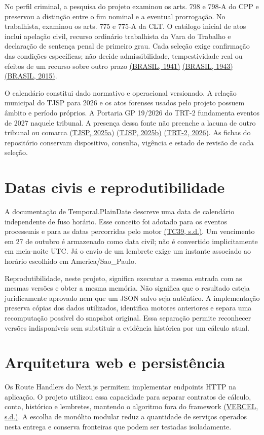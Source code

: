 No perfil criminal, a pesquisa do projeto examinou os arts. 798 e 798-A do CPP e preservou a distinção entre o fim nominal e a eventual prorrogação. No trabalhista, examinou os arts. 775 e 775-A da CLT. O catálogo inicial de atos inclui apelação civil, recurso ordinário trabalhista da Vara do Trabalho e declaração de sentença penal de primeiro grau. Cada seleção exige confirmação das condições específicas; não decide admissibilidade, tempestividade real ou efeitos de um recurso sobre outro prazo \hyperref[ref:CPP]{(BRASIL, 1941)} \hyperref[ref:CLT]{(BRASIL, 1943)} \hyperref[ref:CPC]{(BRASIL, 2015)}.

O calendário constitui dado normativo e operacional versionado. A relação municipal do TJSP para 2026 e os atos forenses usados pelo projeto possuem âmbito e período próprios. A Portaria GP 19/2026 do TRT-2 fundamenta eventos de 2027 naquele tribunal. A presença dessa fonte não preenche a lacuna de outro tribunal ou comarca \hyperref[ref:TJSPMUN]{(TJSP, 2025a)} \hyperref[ref:TJSP2813]{(TJSP, 2025b)} \hyperref[ref:TRT2027]{(TRT-2, 2026)}. As fichas do repositório conservam dispositivo, consulta, vigência e estado de revisão de cada seleção.

\section{Datas civis e reprodutibilidade}
\label{section-2-3}
A documentação de Temporal.PlainDate descreve uma data de calendário independente de fuso horário. Esse conceito foi adotado para os eventos processuais e para as datas percorridas pelo motor \hyperref[ref:TEMPORAL]{(TC39, s.d.)}. Um vencimento em 27 de outubro é armazenado como data civil; não é convertido implicitamente em meia-noite UTC. Já o envio de um lembrete exige um instante associado ao horário escolhido em America/Sao\_Paulo.

Reprodutibilidade, neste projeto, significa executar a mesma entrada com as mesmas versões e obter a mesma memória. Não significa que o resultado esteja juridicamente aprovado nem que um JSON salvo seja autêntico. A implementação preserva cópias dos dados utilizados, identifica motores anteriores e separa uma recomputação possível do snapshot original. Essa separação permite reconhecer versões indisponíveis sem substituir a evidência histórica por um cálculo atual.

\section{Arquitetura web e persistência}
\label{section-2-4}
Os Route Handlers do Next.js permitem implementar endpoints HTTP na aplicação. O projeto utilizou essa capacidade para separar contratos de cálculo, conta, histórico e lembretes, mantendo o algoritmo fora do framework \hyperref[ref:NEXT]{(VERCEL, s.d.)}. A escolha de monólito modular reduz a quantidade de serviços operados nesta entrega e conserva fronteiras que podem ser testadas isoladamente.

